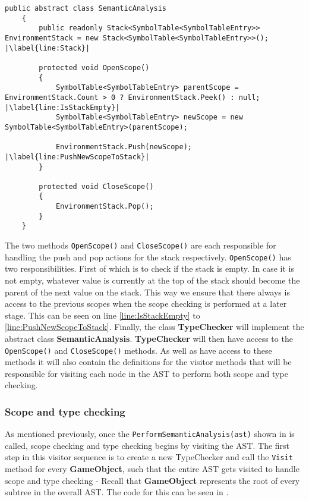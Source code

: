\begin{lstlisting}[caption={Abstract class SemanticAnalysis}, label={lst:ACSemanticAnalysis},escapechar=|]
    public abstract class SemanticAnalysis
    {
        public readonly Stack<SymbolTable<SymbolTableEntry>> EnvironmentStack = new Stack<SymbolTable<SymbolTableEntry>>(); |\label{line:Stack}|

        protected void OpenScope()
        {
            SymbolTable<SymbolTableEntry> parentScope = EnvironmentStack.Count > 0 ? EnvironmentStack.Peek() : null; |\label{line:IsStackEmpty}|
            SymbolTable<SymbolTableEntry> newScope = new SymbolTable<SymbolTableEntry>(parentScope);
            
            EnvironmentStack.Push(newScope); |\label{line:PushNewScopeToStack}|
        }

        protected void CloseScope()
        {
            EnvironmentStack.Pop();
        }
    }
\end{lstlisting}

The two methods \texttt{OpenScope()} and \texttt{CloseScope()} are each responsible for handling the push and pop actions for the stack respectively.
\texttt{OpenScope()} has two responsibilities. First of which is to check if the stack is empty. In case it is not empty, whatever value is currently at the top of the stack should become the parent of the next value on the stack. This way we ensure that there always is access to the previous scopes when the scope checking is performed at a later stage. This can be seen on line \ref{line:IsStackEmpty} to \ref{line:PushNewScopeToStack}.
Finally, the class \textbf{TypeChecker} will implement the abstract class \textbf{SemanticAnalysis}. \textbf{TypeChecker} will then have access to the \texttt{OpenScope()} and \texttt{CloseScope()} methods. As well as have access to these methods it will also contain the definitions for the visitor methods that will be responsible for visiting each node in the AST to perform both scope and type checking.

\subsubsection*{Scope and type checking}
As mentioned previously, once the \texttt{PerformSemanticAnalysis(ast)} shown in  is called, scope checking and type checking begins by visiting the AST. The first step in this visitor sequence is to create a new TypeChecker and call the \texttt{Visit} method for every \textbf{GameObject}, such that the entire AST gets visited to handle scope and type checking - Recall that \textbf{GameObject} represents the root of every subtree in the overall AST. The code for this can be seen in .

